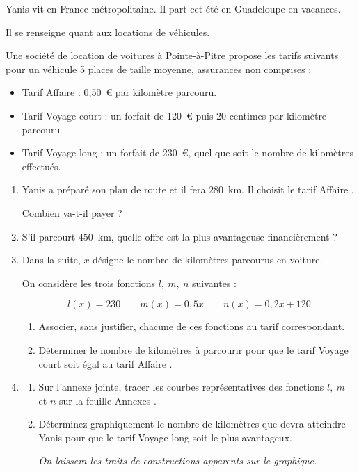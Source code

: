 \documentclass[exercice,a4]{thedocument}%
\begin{document}
%

\bigskip

Yanis vit en France métropolitaine. Il part cet été en Guadeloupe en vacances.

Il se renseigne quant aux locations de véhicules.

Une société de location de voitures à Pointe-à-Pitre propose les tarifs suivants pour un véhicule  5 places de taille moyenne,  assurances non comprises :

\begin{itemize}
\item[$\bullet~~$]Tarif \og Affaire \fg{} : 0,50~\euro{} par kilomètre parcouru.
\item[$\bullet~~$]Tarif \og Voyage court \fg{} : un forfait de 120~\euro{} puis 20 centimes par
kilomètre parcouru
\item[$\bullet~~$]Tarif \og Voyage long \fg : un forfait de 230~\euro, quel que soit le nombre de kilomètres effectués.
\end{itemize}

\medskip

\begin{enumerate}
\item Yanis a préparé son plan de route et il fera $280$~km. Il choisit le tarif
\og Affaire \fg.

Combien va-t-il payer ?
\item S'il parcourt $450$~km, quelle offre est la plus avantageuse financièrement ?
\item Dans la suite, $x$ désigne le nombre de kilomètres parcourus en voiture.

On considère les trois fonctions  $l,\:m,\:n$ suivantes :

\[l(x) = 230 \qquad m(x) = 0,5x \qquad n(x) = 0,2x + 120\]

	\begin{enumerate}
		\item Associer, sans justifier, chacune de ces fonctions au tarif correspondant.
		\item Déterminer le nombre de kilomètres à parcourir pour que le tarif \og Voyage court \fg{} soit égal au tarif \og Affaire \fg.
	\end{enumerate}
\item
	\begin{enumerate}
		\item Sur l'annexe jointe, tracer les courbes représentatives des fonctions $l,\:m$ et $n$ sur la feuille \og Annexes \fg.
		\item Déterminez graphiquement le nombre de kilomètres que devra atteindre Yanis  pour que le tarif \og Voyage long \fg soit le plus avantageux.

\emph{On laissera les traits de constructions apparents sur le graphique.}
	\end{enumerate}
\end{enumerate}

\bigskip

\showthesource
\end{document}
